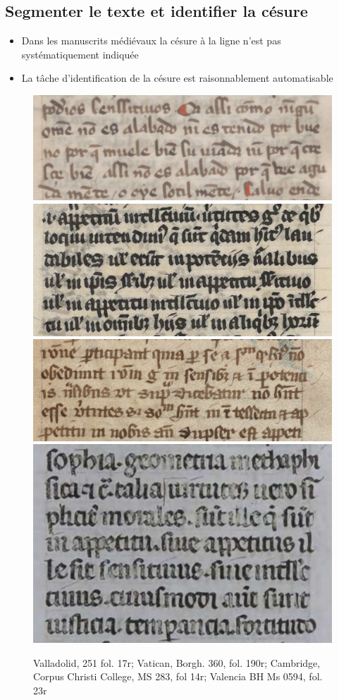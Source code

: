 \documentclass[11pt,aspectratio=169]{beamer}
\begin{document}
\subsection{Segmenter le texte et identifier la césure}
\begin{frame}
\begin{center}
\begin{itemize}
\item Dans les manuscrits médiévaux la césure à la ligne n'est pas systématiquement indiquée
\item La tâche d'identification de la césure est raisonnablement automatisable
\end{itemize}
\begin{figure}
\includegraphics[width=.33\textwidth]{img/Valladolid_251_17r.png}
\includegraphics[width=.33\textwidth]{img/Borgh_360_190r.png}
\includegraphics[width=.33\textwidth]{img/CCC_MSS_283_14r.png}
\includegraphics[width=.33\textwidth]{img/Valencia_BH-Ms-0594_23r.png}
\caption{Valladolid, 251 fol. 17r; Vatican, Borgh. 360, fol. 190r; Cambridge, Corpus Christi College, MS 283, fol 14r; Valencia BH Ms 0594, fol. 23r}
\end{figure}
\end{center}
\end{frame}
\end{document}
